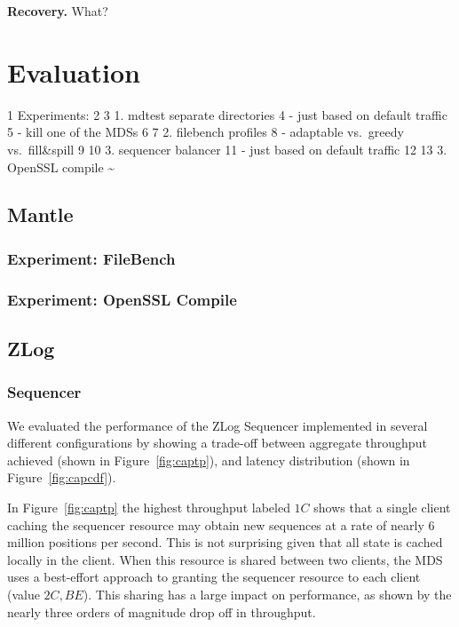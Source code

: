 \documentclass[10pt,twocolumn]{article}
\begin{document}
{\bf Recovery.}
What?

\section{Evaluation}\label{evaluation}

1 Experiments: 2 3 1. mdtest separate directories 4 - just based on
default traffic 5 - kill one of the MDSs 6 7 2. filebench profiles 8 -
adaptable vs.~greedy vs.~fill\&spill 9 10 3. sequencer balancer 11 -
just based on default traffic 12 13 3. OpenSSL compile
\textasciitilde{}\\\label{evaluation}

\subsection{Mantle}\label{mantle}

\subsubsection{Experiment: FileBench}\label{experiment-filebench}

\subsubsection{Experiment: OpenSSL
Compile}\label{experiment-openssl-compile}

\subsection{ZLog}

\subsubsection{Sequencer}

We evaluated the performance of the ZLog Sequencer implemented in several
different configurations by showing a trade-off between aggregate throughput
achieved (shown in Figure~\ref{fig:captp}), and latency distribution (shown in
Figure~\ref{fig:capcdf}).

In Figure~\ref{fig:captp} the highest throughput labeled $1C$ shows that a
single client caching the sequencer resource may obtain new sequences at a rate
of nearly 6 million positions per second. This is not surprising given that all
state is cached locally in the client. When this resource is shared between two
clients, the MDS uses a best-effort approach to granting the sequencer resource
to each client (value $2C,BE$). This sharing has a large impact on performance,
as shown by the nearly three orders of magnitude drop off in throughput.
\end{document}
